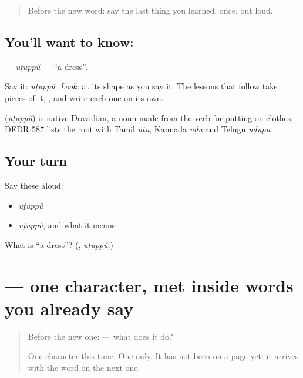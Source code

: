 \label{lesson:ML-C04-uduppu}



\begin{quote}
Before the new word: say the last thing you learned, once, out loud.
\end{quote}

\subsection*{You'll want to know: }
\textbf{} — \emph{uṭuppŭ} — \textquotedblleft{}a dress\textquotedblright{}.

Say it: \emph{uṭuppŭ}. \emph{Look:} at its shape as you say it. The lessons that follow take pieces of it, \textbf{}, and write each one on its own.

\begin{cousinweb}
\textbf{} (\emph{uṭuppŭ}) is native Dravidian, a noun made from the verb for putting on clothes; DEDR 587 lists the root with Tamil \emph{uṭu}, Kannada \emph{uḍu} and Telugu \emph{uḍupu}.
\end{cousinweb}

\subsection*{Your turn}
Say these aloud:

\begin{itemize}
\raggedright
  \item \emph{uṭuppŭ}
  \item \emph{uṭuppŭ}, and what it means
\end{itemize}

\begin{tcolorbox}[breakable,colback=teal!4,colframe=teal!35!black,title={Before you move on}]
What is \textquotedblleft{}a dress\textquotedblright{}? (\textbf{}, \emph{uṭuppŭ}.)
\end{tcolorbox}
\section[\texorpdfstring{\ml{ഉ} (u)}{ഉ (u)}]{ — one character, met inside words you already say}

\label{lesson:ML-S116-letter-u}



\begin{quote}
Before the new one:  — what does it do?

One character this time. One only. It has not been on a page yet: it arrives with the word on the next one.
\end{quote}

